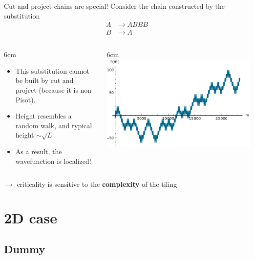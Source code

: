 \documentclass[xcolor=x11names,compress,professionalfonts]{beamer}
\renewcommand{\(}{\begin{columns}}
\renewcommand{\)}{\end{columns}}
\newcommand{\<}[1]{\begin{column}{#1}}
\renewcommand{\>}{\end{column}}
\begin{document}
\begin{frame}{Cut and project chains are special!}
Consider the chain constructed by the substitution
\begin{align*}
	A & \to ABBB \\
	B & \to A
\end{align*}
\begin{columns}
\<{6cm}
\begin{itemize}
	\item This substitution cannot be built by cut and project (because it is non-Pisot).
	\item Height resembles a random walk, and typical height $\sim \sqrt{L}$
	\item As a result, the wavefunction is localized! 
\end{itemize}
\>
\<{6cm}
\includegraphics[scale=.5]{img/heightsB3.pdf}
\>
\end{columns}
$\rightarrow$ criticality is sensitive to the \textbf{complexity} of the tiling
\end{frame}

\section{2D case}
\subsection{Dummy}
\end{document}
